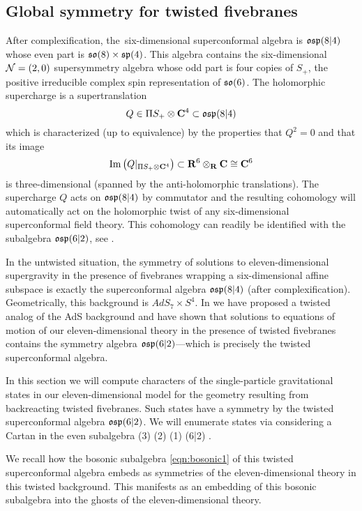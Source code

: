 \subsection{Global symmetry for twisted fivebranes}

After complexification, the~six-dimensional superconformal algebra is $\mathfrak{osp}(8|4)$ whose even part is $\mathfrak{so}(8) \times \mathfrak{sp}(4)$. 
This algebra contains the six-dimensional $\mathcal N=(2,0)$ supersymmetry algebra whose odd part is four copies of $S_+$, the positive irreducible complex spin representation of $\mathfrak{so}(6)$.
The holomorphic supercharge is a supertranslation 
\[
Q \in \Pi S_+ \otimes \mathbf{C}^4 \subset \mathfrak{osp}(8|4)
\]
which is characterized (up to equivalence) by the properties that $Q^2 = 0$ and that its image
\[
{\rm Im}\left(Q|_{\Pi S_+ \otimes \mathbf{C}^4} \right) \subset \mathbf{R}^6 \otimes_{\mathbf{R}} \mathbf{C} \cong \mathbf{C}^6
\]
is three-dimensional (spanned by the anti-holomorphic translations). 
The supercharge $Q$ acts on $\mathfrak{osp}(8|4)$ by commutator and the resulting cohomology will automatically act on the holomorphic twist of any six-dimensional superconformal field theory. 
This cohomology can readily be identified with the subalgebra $\mathfrak{osp}(6|2)$, see \cite{SWe36}. 

In the untwisted situation, the symmetry of solutions to eleven-dimensional supergravity in the presence of fivebranes wrapping a six-dimensional affine subspace is exactly the superconformal algebra $\mathfrak{osp}(8|4)$ (after complexification). 
Geometrically, this background is $AdS_7 \times S^4$. 
In \cite{RSW} we have proposed a twisted analog of the AdS background and have shown that solutions to equations of motion of our eleven-dimensional theory in the presence of twisted fivebranes contains the symmetry algebra $\mathfrak{osp}(6|2)$---which is precisely the twisted superconformal algebra.

In this section we will compute characters of the single-particle gravitational states in our eleven-dimensional model for the geometry resulting from backreacting twisted fivebranes.
Such states have a symmetry by the twisted superconformal algebra $\mathfrak{osp}(6|2)$. 
We will enumerate states via considering a Cartan in the even subalgebra
\beqn\label{eqn:bosonic1}
(3) \times {}(2) \times {}(1) \subset {}(6|2) .
\eeqn



We recall how the bosonic subalgebra \eqref{eqn:bosonic1} of this twisted superconformal algebra embeds as symmetries of the eleven-dimensional theory in this twisted background. 
This manifests as an embedding of this bosonic subalgebra into the ghosts of the eleven-dimensional theory. 

